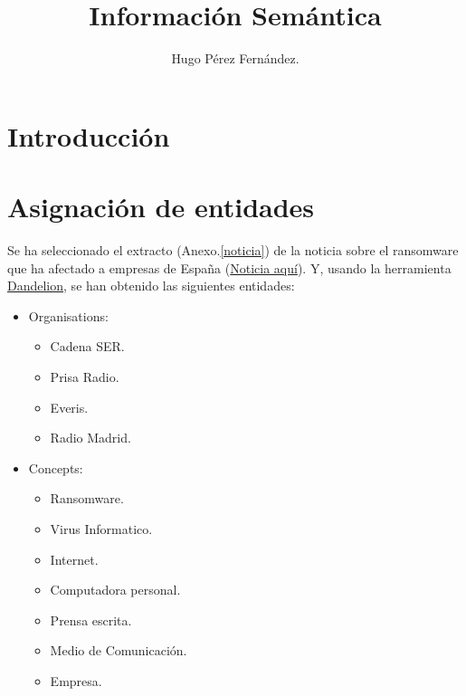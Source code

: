 \documentclass{llncs}   %
\begin{document}
\title{Información Semántica}

\author{Hugo Pérez Fernández.  
}
\maketitle              

\begin{abstract}

\end{abstract}

\section{Introducción}

\section{Asignación de entidades}
Se ha seleccionado el extracto (Anexo.\ref{noticia}) de la noticia sobre el ransomware que 
ha afectado a empresas de España 
(\href{https://www.elconfidencial.com/tecnologia/2019-11-04/everis-la-ser-ciberataque-ransomware_2312019/}{Noticia aquí}).
Y, usando la herramienta \href{https://dandelion.eu/semantic-text/entity-extraction-demo/}{Dandelion}, 
se han obtenido las siguientes entidades:

\begin{itemize}
    \item Organisations:
    \begin{itemize}
        \item Cadena SER.
        \item Prisa Radio.
        \item Everis.
        \item Radio Madrid.
    \end{itemize}
    \item Concepts:
    \begin{itemize}
        \item Ransomware.
        \item Virus Informatico.
        \item Internet.
        \item Computadora personal.
        \item Prensa escrita.
        \item Medio de Comunicación.
        \item Empresa.
    \end{itemize}
\end{itemize}
\end{document}
